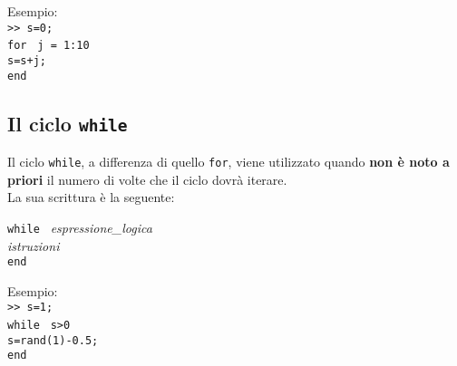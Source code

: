 Esempio: \\
\texttt{>> s=0;} \\
\texttt{for } \texttt{j = 1:10} \\ 
\hspace{1cm}\texttt{s=s+j;}  \\
\texttt{end}

\subsection{Il ciclo \texttt{while}}
Il ciclo \texttt{while}, a differenza di quello \texttt{for}, viene utilizzato quando \textbf{non è noto a priori} il 
numero di volte che il ciclo dovrà iterare. \\
La sua scrittura è la seguente:
\begin{center}
\texttt{while } \textit{espressione\_logica} \\ 
\hspace{1.5cm}\textit{istruzioni}  \\
\hspace{-4.1cm}\texttt{end}
\end{center}

Esempio: \\
\texttt{>> s=1;} \\
\texttt{while } \texttt{s>0} \\ 
\hspace{1cm}\texttt{s=rand(1)-0.5;}  \\
\texttt{end}